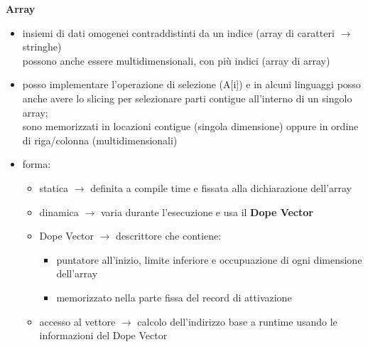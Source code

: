 \documentclass{article}
\begin{document}
\begin{flushleft}
\textbf{Array}
\begin{itemize}
  \item insiemi di dati omogenei contraddistinti da un indice (array di caratteri $\rightarrow$ stringhe) \\
        possono anche essere multidimensionali, con più indici (array di array)
  \item posso implementare l'operazione di selezione (A[i]) e in alcuni linguaggi 
        posso anche avere lo slicing per selezionare parti contigue all'interno di un singolo array; \\
        sono memorizzati in locazioni contigue (singola dimensione) oppure in ordine di riga/colonna (multidimensionali)
  \item forma: 
        \begin{itemize}
          \item statica  $\rightarrow$ definita a compile time e fissata alla dichiarazione dell'array
          \item dinamica  $\rightarrow$ varia durante l'esecuzione e usa il \textbf{Dope Vector}
          \item Dope Vector  $\rightarrow$ descrittore che contiene: 
          \begin{itemize}
            \item puntatore all'inizio, limite inferiore e occupuazione di ogni dimensione dell'array
            \item memorizzato nella parte fissa del record di attivazione 
          \end{itemize}
          \item accesso al vettore  $\rightarrow$ calcolo dell'indirizzo base a runtime usando le informazioni del Dope Vector
        \end{itemize}
\end{itemize}

\newpage

\end{flushleft}
\end{document}
